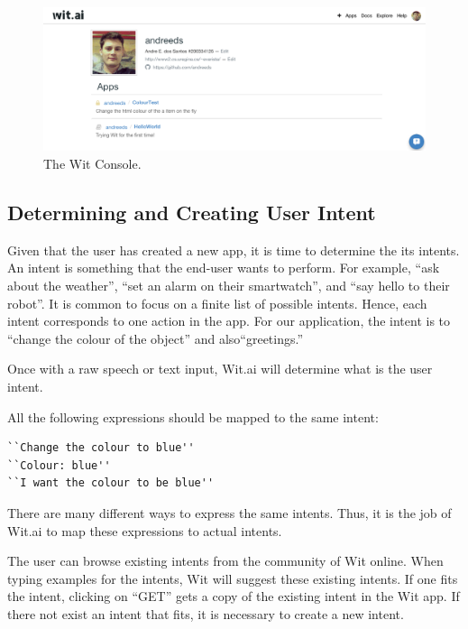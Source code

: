 \documentclass[twoside,11pt]{article}
\begin{document}
\begin{figure}
\label{fig:console}
\centerline{
\includegraphics[width=\textwidth]{figures/Wit_Console.png}
}
\caption{The Wit Console.}
\end{figure}

\subsection{Determining and Creating User Intent}

Given that the user has created a new app, it is time to determine the its intents.
An intent is something that the end-user wants to perform.
For example,
``ask about the weather'', 
``set an alarm on their smartwatch'', and 
``say hello to their robot''.
It is common to focus on a finite list of possible intents.
Hence, each intent corresponds to one action in the app.
For our application, the intent is to ``change the colour of the object'' and also``greetings.''

Once with a raw speech or text input, Wit.ai will determine what is the user intent.

\begin{example}
\label{exe:intent}
All the following expressions should be mapped to the same intent:
\begin{lstlisting}[language=html]
``Change the colour to blue''
``Colour: blue''
``I want the colour to be blue''
\end{lstlisting}
\end{example}

There are many different ways to express the same intents. 
Thus, it is the job of Wit.ai to map these expressions to actual intents.

The user can browse existing intents from the community of Wit online.
When typing examples for the intents, Wit will suggest these existing intents. 
If one fits the intent, clicking on “GET” gets a copy of the existing intent in the Wit app.
If there not exist an intent that fits, it is necessary to create a new intent.
\end{document}
